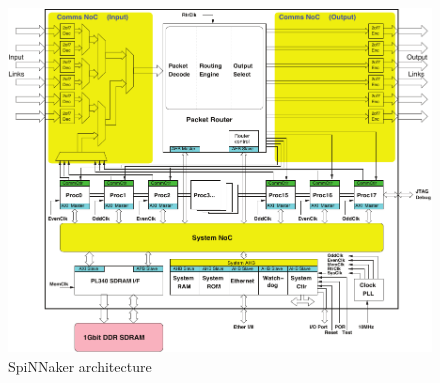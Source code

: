 \documentclass[a4paper, 11pt]{article}
\begin{document}
\begin{figure}[htbp]
	\centering
	\includegraphics[width=0.7\linewidth]{images/spinnaker_architecture.pdf}
	\caption{SpiNNaker architecture}	
	\label{fig:spin_arch}
\end{figure}
\end{document}
